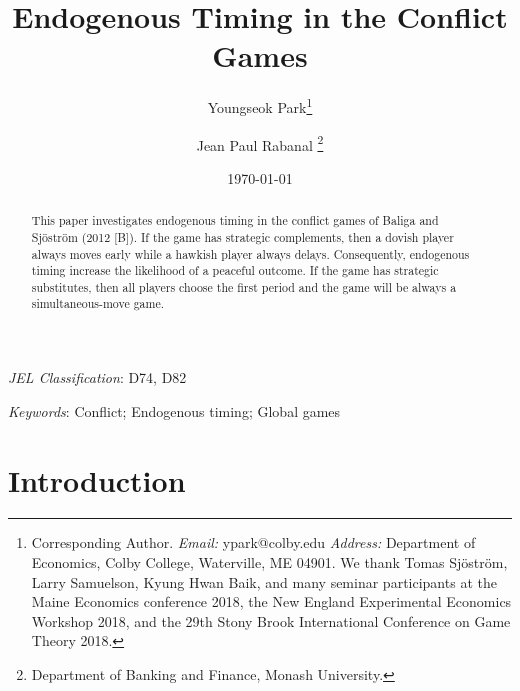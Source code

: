 \documentclass[12pt,english]{article}
\begin{document}
\title{Endogenous Timing in the Conflict Games}

\author{Youngseok Park\footnotemark[] \thanks{Corresponding Author. \textit{Email:}
    ypark@colby.edu \textit{Address:} 
Department of Economics, Colby College, Waterville, ME 04901. We thank Tomas Sj\"ostr\"om, Larry Samuelson, Kyung Hwan Baik, and many seminar participants at the Maine Economics conference 2018, the New England Experimental Economics Workshop 2018, and the 29th Stony Brook International Conference on Game Theory 2018.}
 \and Jean Paul Rabanal \thanks{Department of Banking and Finance, Monash University.}}
\date{\today}
\maketitle

\begin{abstract}
\noindent This paper investigates endogenous timing in the conflict games of Baliga and Sj\"ostr\"om (2012 [B]). If the game has strategic complements, then a dovish player always moves early while a hawkish player always delays. Consequently, endogenous timing increase the likelihood of a peaceful outcome. If the game has strategic substitutes, then all players choose the first period and the game will be always a simultaneous-move game. 
\end{abstract} 

\textit{JEL Classification}: D74, D82 \par 
\textit{Keywords}: Conflict; Endogenous timing; Global games

\newpage
\section{Introduction}
\end{document}
